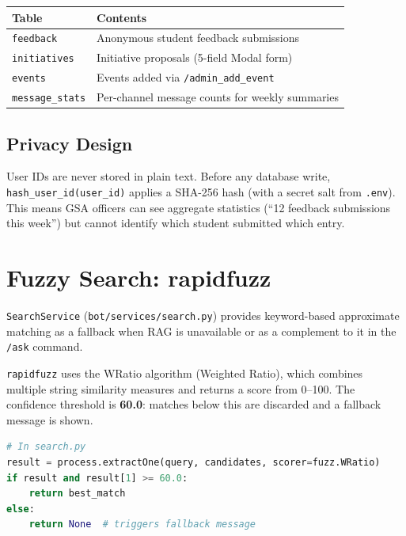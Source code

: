 \documentclass[12pt,letterpaper]{article}
\begin{document}
\begin{center}
\begin{tabular}{ll}
\toprule
\textbf{Table} & \textbf{Contents} \\
\midrule
\texttt{feedback} & Anonymous student feedback submissions \\
\texttt{initiatives} & Initiative proposals (5-field Modal form) \\
\texttt{events} & Events added via \texttt{/admin\_add\_event} \\
\texttt{message\_stats} & Per-channel message counts for weekly summaries \\
\bottomrule
\end{tabular}
\end{center}

\subsection{Privacy Design}

User IDs are never stored in plain text. Before any database write,
\texttt{hash\_user\_id(user\_id)} applies a SHA-256 hash (with a secret salt
from \texttt{.env}). This means GSA officers can see aggregate statistics
(``12 feedback submissions this week'') but cannot identify which student
submitted which entry.

\section{Fuzzy Search: rapidfuzz}

\texttt{SearchService} (\texttt{bot/services/search.py}) provides keyword-based
approximate matching as a fallback when RAG is unavailable or as a complement to
it in the \texttt{/ask} command.

\texttt{rapidfuzz} uses the WRatio algorithm (Weighted Ratio), which combines
multiple string similarity measures and returns a score from 0–100. The
confidence threshold is \textbf{60.0}: matches below this are discarded and a
fallback message is shown.

\begin{lstlisting}[language=Python, caption={How the threshold works}]
# In search.py
result = process.extractOne(query, candidates, scorer=fuzz.WRatio)
if result and result[1] >= 60.0:
    return best_match
else:
    return None  # triggers fallback message
\end{lstlisting}
\end{document}
